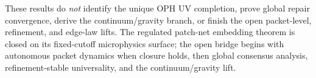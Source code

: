 \documentclass[11pt]{article}
\begin{document}
These results do \emph{not} identify the unique OPH UV completion, prove global repair
convergence, derive the continuum/gravity branch, or finish the open packet-level,
refinement, and edge-law lifts. The regulated patch-net embedding theorem is closed on its
fixed-cutoff microphysics surface; the open bridge begins with autonomous packet dynamics
when closure holds, then global consensus analysis, refinement-stable universality, and the
continuum/gravity lift.

\appendix

\end{document}
